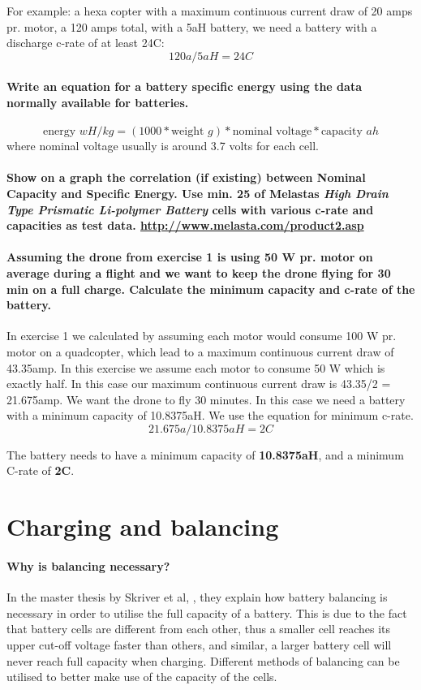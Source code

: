 \documentclass[paper=letter, fontsize=10pt]{article}
\begin{document}
For example: a hexa copter with a maximum continuous current draw of 20 amps pr. motor, a 120 amps total, with a 5aH battery, we need a battery with a discharge c-rate of at least 24C:
\[120a/5aH = 24C\]

\paragraph{Write an equation for a battery specific energy using the data normally available for batteries.}
\begin{equation}
\text{energy } wH/kg = (1000 * \text{weight } g) * \text{nominal voltage} * \text{capacity } ah
\end{equation}
where nominal voltage usually is around 3.7 volts for each cell.

\paragraph{Show on a graph the correlation (if existing) between Nominal Capacity and Specific Energy. Use min. 25 of Melastas \textit{High Drain Type Prismatic Li-polymer Battery} cells with various c-rate and capacities as test data. \url{http://www.melasta.com/product2.asp}}

\paragraph{Assuming the drone from exercise 1 is using 50 W pr. motor on average during a flight and we want to keep the drone flying for 30 min on a full charge. Calculate the minimum capacity and c-rate of the battery.}
In exercise 1 we calculated by assuming each motor would consume 100 W pr. motor on a quadcopter, which lead to a maximum continuous current draw of 43.35amp. In this exercise we assume each motor to consume 50 W which is exactly half. In this case our maximum continuous current draw is 43.35/2 = 21.675amp. We want the drone to fly 30 minutes. In this case we need a battery with a minimum capacity of 10.8375aH. We use the equation for minimum c-rate.
\[21.675a/10.8375aH = 2C\]

The battery needs to have a minimum capacity of \textbf{10.8375aH}, and a minimum C-rate of \textbf{2C}.

\section{Charging and balancing}

\paragraph{Why is balancing necessary?}
In the master thesis by Skriver et al, \cite{master_thesis}, they explain how battery balancing is necessary in order to utilise the full capacity of a battery. This is due to the fact that battery cells are different from each other, thus a smaller cell reaches its upper cut-off voltage faster than others, and similar, a larger battery cell will never reach full capacity when charging. Different methods of balancing can be utilised to better make use of the capacity of the cells. 
\end{document}
